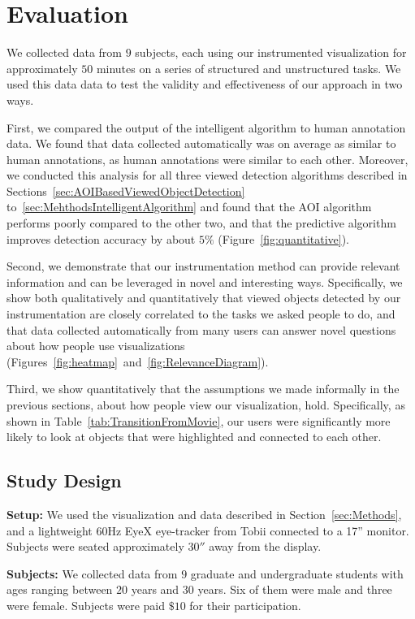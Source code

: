 \section{Evaluation}
\label{sec:Evaluation}
We collected data from $9$ subjects, each using our instrumented visualization for approximately $50$ minutes on a series of structured and unstructured tasks. We used this data data to test the validity and effectiveness of our approach in two ways. 

First, we compared the output of the intelligent algorithm to human annotation data. We found that data collected automatically was on average as similar to human annotations, as human annotations were similar to each other. Moreover, we conducted this analysis for all three viewed detection algorithms described in Sections~\ref{sec:AOIBasedViewedObjectDetection} to~\ref{sec:MehthodsIntelligentAlgorithm} and found that the AOI algorithm performs poorly compared to the other two, and that the predictive algorithm improves detection accuracy by about $5\%$  (Figure~\ref{fig:quantitative}). 

Second, we demonstrate that our instrumentation method can provide relevant information and can be leveraged in novel and interesting ways. Specifically, we show both qualitatively and quantitatively that viewed objects detected by our instrumentation are closely correlated to the tasks we asked people to do, and that data collected automatically from many users can answer novel questions about how people use visualizations (Figures~\ref{fig:heatmap}~and~\ref{fig:RelevanceDiagram}).    

Third, we show quantitatively that the assumptions we made informally in the previous sections, about how people view our visualization, hold. Specifically, as shown in Table~\ref{tab:TransitionFromMovie}, our users were significantly more likely to look at objects that were highlighted and connected to each other. 

\subsection{Study Design }
\label{sec:EvalStudyDesign}

\noindent\textbf{Setup: } We used the visualization and data described in Section~\ref{sec:Methods}, and a lightweight $60$Hz EyeX eye-tracker from Tobii connected to a 17'' monitor. Subjects were seated approximately $30''$ away from the display. 

\noindent\textbf{Subjects:} We collected data from $9$ graduate and undergraduate students with ages ranging between $20$ years and $30$ years. Six of them were male and three were female. Subjects were paid $\$10$ for their participation. 

